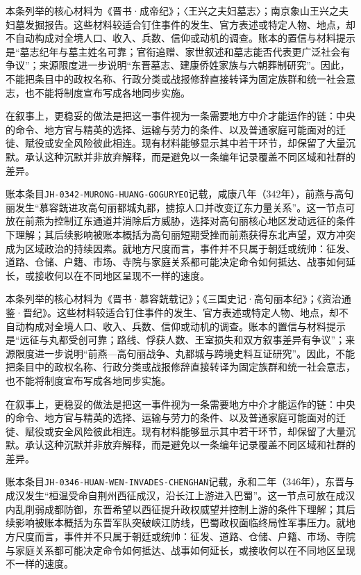 本条列举的核心材料为《晋书·成帝纪》；〈王兴之夫妇墓志〉；南京象山王兴之夫妇墓发掘报告。这些材料较适合钉住事件的发生、官方表述或特定人物、地点，却不自动构成对全境人口、收入、兵数、信仰或动机的调查。账本的置信与材料提示是“墓志纪年与墓主姓名可靠；官衔追赠、家世叙述和墓志能否代表更广泛社会有争议”；来源限度进一步说明“东晋墓志、建康侨姓家族与六朝葬制研究”。因此，不能把条目中的政权名称、行政分类或战报修辞直接转译为固定族群和统一社会意志，也不能将制度宣布写成各地同步实施。

在叙事上，更稳妥的做法是把这一事件视为一条需要地方中介才能运作的链：中央的命令、地方官与精英的选择、运输与劳力的条件、以及普通家庭可能面对的迁徙、赋役或安全风险彼此相连。现有材料能够显示其中若干环节，却保留了大量沉默。承认这种沉默并非放弃解释，而是避免以一条编年记录覆盖不同区域和社群的差异。

账本条目\texttt{JH-0342-MURONG-HUANG-GOGURYEO}记载，咸康八年（342年），前燕与高句丽发生“慕容皝进攻高句丽都城丸都，掳掠人口并改变辽东力量关系”。这一节点可放在前燕为控制辽东通道并消除后方威胁，选择对高句丽核心地区发动远征的条件下理解；其后续影响被账本概括为高句丽短期受挫而前燕获得东北声望，双方冲突成为区域政治的持续因素。就地方尺度而言，事件并不只属于朝廷或统帅：征发、道路、仓储、户籍、市场、寺院与家庭关系都可能决定命令如何抵达、战事如何延长，或接收何以在不同地区呈现不一样的速度。

本条列举的核心材料为《晋书·慕容皝载记》；《三国史记·高句丽本纪》；《资治通鉴·晋纪》。这些材料较适合钉住事件的发生、官方表述或特定人物、地点，却不自动构成对全境人口、收入、兵数、信仰或动机的调查。账本的置信与材料提示是“远征与丸都受创可靠；路线、俘获人数、王室损失和双方叙事差异有争议”；来源限度进一步说明“前燕—高句丽战争、丸都城与跨境史料互证研究”。因此，不能把条目中的政权名称、行政分类或战报修辞直接转译为固定族群和统一社会意志，也不能将制度宣布写成各地同步实施。

在叙事上，更稳妥的做法是把这一事件视为一条需要地方中介才能运作的链：中央的命令、地方官与精英的选择、运输与劳力的条件、以及普通家庭可能面对的迁徙、赋役或安全风险彼此相连。现有材料能够显示其中若干环节，却保留了大量沉默。承认这种沉默并非放弃解释，而是避免以一条编年记录覆盖不同区域和社群的差异。

账本条目\texttt{JH-0346-HUAN-WEN-INVADES-CHENGHAN}记载，永和二年（346年），东晋与成汉发生“桓温受命自荆州西征成汉，沿长江上游进入巴蜀”。这一节点可放在成汉内乱削弱成都防御，东晋希望以西征提升政权威望并控制上游的条件下理解；其后续影响被账本概括为东晋军队突破峡江防线，巴蜀政权面临终局性军事压力。就地方尺度而言，事件并不只属于朝廷或统帅：征发、道路、仓储、户籍、市场、寺院与家庭关系都可能决定命令如何抵达、战事如何延长，或接收何以在不同地区呈现不一样的速度。

